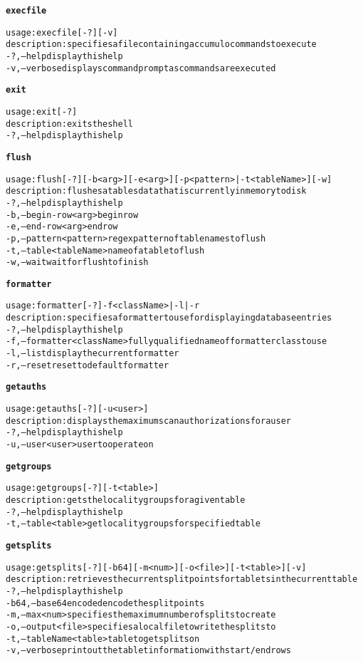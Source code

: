 \begin{alltt}
\textbf{execfile}

    usage: execfile [-?] [-v]
    description: specifies a file containing accumulo commands to execute
      -?,--help  display this help
      -v,--verbose	displays command prompt as commands are executed

\textbf{exit}

    usage: exit [-?]
    description: exits the shell
      -?,--help  display this help

\textbf{flush}

    usage: flush [-?] [-b <arg>] [-e <arg>] [-p <pattern> | -t <tableName>]  [-w]
    description: flushes a tables data that is currently in memory to disk
      -?,--help  display this help
      -b,--begin-row <arg>	begin row
      -e,--end-row <arg>  end row
      -p,--pattern <pattern>  regex pattern of table names to flush
      -t,--table <tableName>  name of a table to flush
      -w,--wait  wait for flush to finish

\textbf{formatter}

    usage: formatter [-?] -f <className> | -l | -r
    description: specifies a formatter to use for displaying database entries
      -?,--help  display this help
      -f,--formatter <className>  fully qualified name of formatter class to use
      -l,--list  display the current formatter
      -r,--reset  reset to default formatter

\textbf{getauths}

    usage: getauths [-?] [-u <user>]
    description: displays the maximum scan authorizations for a user
      -?,--help  display this help
      -u,--user <user>  user to operate on

\textbf{getgroups}

    usage: getgroups [-?] [-t <table>]
    description: gets the locality groups for a given table
      -?,--help  display this help
      -t,--table <table>  get locality groups for specified table

\textbf{getsplits}

    usage: getsplits [-?] [-b64] [-m <num>] [-o <file>] [-t <table>] [-v]
    description: retrieves the current split points for tablets in the current table
      -?,--help  display this help
      -b64,--base64encoded	encode the split points
      -m,--max <num>  specifies the maximum number of splits to create
      -o,--output <file>  specifies a local file to write the splits to
      -t,--tableName <table>  table to get splits on
      -v,--verbose	print out the tablet information with start/end rows


\end{alltt}
